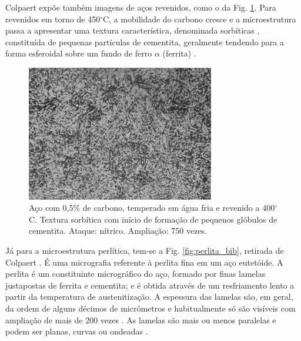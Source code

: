 \documentclass[
12pt,
openany, %
oneside, %
a4paper,			
english,			
brazil			        %
]{abntbibufjf}
\begin{document}
	Colpaert \cite{colpaert1994metalografia} expõe também imagens de aços revenidos, como o da Fig. \ref{fig:revenido_bib}. Para revenidos em torno de 450$^\circ$C, a mobilidade do carbono cresce e a microestrutura passa a apresentar uma textura característica, denominada sorbíticas \cite{colpaert1994metalografia}, constituída de pequenas partículas de cementita, geralmente tendendo para a forma esferoidal sobre um fundo de ferro $\alpha$ (ferrita) \cite{colpaert1994metalografia}.
	\begin{figure}[H]
		\centering
		\includegraphics[width=0.73\textwidth]{revenido_bib}
		\caption{Aço com 0,5\% de carbono, temperado em água fria e revenido a 400$^\circ$C. Textura sorbítica com início de formação de pequenos glóbulos de cementita. Ataque: nítrico. Ampliação: 750 vezes. \cite{colpaert1994metalografia}}
		\label{fig:revenido_bib}
	\end{figure}
	
	Já para a microestrutura perlítica, tem-se a Fig. \ref{fig:perlita_bib}, retirada de Colpaert \cite{colpaert1994metalografia}. É uma micrografia referente à perlita fina em um aço eutetóide. A perlita é um constituinte micrográfico do aço, formado por finas lamelas justapostas de ferrita e cementita; e é obtida através de um resfriamento lento a partir da temperatura de austenitização. A espessura das lamelas são, em geral, da ordem de alguns décimos de micrômetros e habitualmente só são visíveis com ampliação de mais de 200 vezes \cite{colpaert1994metalografia}. As lamelas são mais ou menos paralelas e podem ser planas, curvas ou ondeadas \cite{colpaert1994metalografia}.
	
\end{document}
